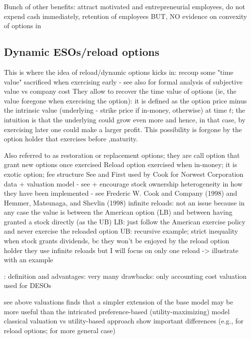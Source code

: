     Bunch of other benefits: attract motivated and entrepreneurial employees, do not expend cash immediately, retention of employees  \cite{hall2003trouble}
    BUT, NO evidence on convexity of options in \cite{hayes2012stock}

\subsection{Dynamic ESOs/reload options} %
    This is where the idea of reload/dynamic options kicks in: recoup some "time value" sacrificed when exercising early - see also \cite{hall2002stock} for formal analysis of subjective value vs company cost
    They allow to recover the time value of options (ie, the value foregone when exercising the option): it is defined as the option price minus the intrinsic value (underlying - strike price if in-money, otherwise) at time $t$; the intuition is that the underlying could grow even more and hence, in that case, by exercising later one could make a larger profit. This possibility is forgone by the option holder that exercises before ,maturity.

    Also referred to as restoration or replacement options; they are call option that grant new options once exercised
    Reload option exercised when in-money; it is exotic option; fee structure \cite{zhang2010knightian}
    See \cite{hemmer1998optimal} and \cite{hemmer2000reload}
    First used by Cook for Norwest Corporation
    data + valuation model - see \cite{dybvig2003employee}
    + encourage stock ownership 
    heterogeneity in how they have been implemented - see Frederic W. Cook and Company (1998) and Hemmer, Matsunaga, and Shevlin (1998) 
        infinite reloads: not an issue because in any case the value is between the American option (LB) and between having granted a stock directly (as the UB) \cite{dybvig2003employee}
            LB: just follow the American exercise policy and never exercise the reloaded option
            UB: recursive example; strict inequality when stock grants dividends, bc they won't be enjoyed by the reload option holder 
            they use infinite reloads but I will focus on only one reload 
    -> illustrate with an example


    \cite{huang2013dynamic}:
        definition and 
        advantages: very many
        drawbacks: only accounting cost
        valuation used for DESOs

    see above valuations 
    \cite{carpenter1998exercise} finds that a simpler extension of the base model may be more useful than the intricated preference-based (utility-maximizing) model
    classical valuation vs utility-based approach show important differences (e.g., \cite{lau2005valuation} for reload options; \cite{ingersoll2006subjective} for more general case)


